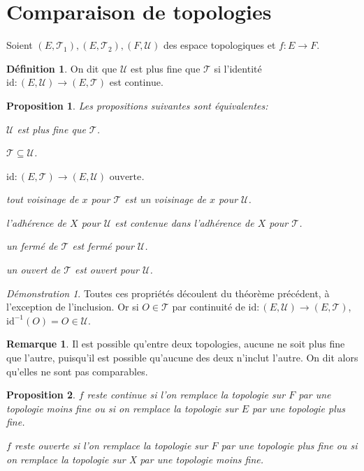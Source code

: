 \documentclass[a4paper, 11pt, french]{book}
\newenvironment{itemise}{\itemize}{\enditemize}
\theoremstyle{plain} %
\newtheorem{proposition}{Proposition}
\theoremstyle{definition} %
\newtheorem{definition}{Définition}
\newtheorem{remarque}{Remarque}
\theoremstyle{remark} %
\newtheorem*{demonstration}{Démonstration}
\newcommand{\1}{\mathds{1}}
\newcommand{\id}{\mathrm{id}}
\newcommand{\inv}[1]{#1^{-1}}
\begin{document}
\section{Comparaison de topologies}

Soient $(E, \mathscr{T}_1), (E, \mathscr{T}_2), (F, \mathscr{U})$ des espace topologiques et $f\colon E\rightarrow F$.

\begin{definition}
	On dit que $\mathscr{U}$ est plus fine que $\mathscr{T}$ si l'identité $\id\colon(E, \mathscr{U})\rightarrow(E, \mathscr{T})$ est continue.
\end{definition}

\begin{proposition}
	Les propositions suivantes sont équivalentes:
	\begin{itemise}
		\item $\mathscr{U}$ est plus fine que $\mathscr{T}$.
		\item $\mathscr{T}\subseteq\mathscr{U}$.
		\item $\id\colon(E, \mathscr{T})\rightarrow(E, \mathscr{U})\text{ ouverte}$.
		\item tout voisinage de $x$ pour $\mathscr{T}$ est un voisinage de $x$ pour $\mathscr{U}$.
		\item l'adhérence de $X$ pour $\mathscr{U}$ est contenue dans l'adhérence de $X$ pour $\mathscr{T}$.
		\item un fermé de $\mathscr{T}$ est fermé pour $\mathscr{U}$.
		\item un ouvert de $\mathscr{T}$ est ouvert pour $\mathscr{U}$.
	\end{itemise}
\end{proposition}

\begin{demonstration}
	Toutes ces propriétés découlent du théorème précédent, à l'exception de l'inclusion.
	Or si $O\in\mathscr{T}$ par continuité de $\id\colon(E, \mathscr{U})\rightarrow(E, \mathscr{T})$, $\inv{\id}(O)=O\in\mathscr{U}$.
\end{demonstration}

\begin{remarque}
	Il est possible qu'entre deux topologies, aucune ne soit plus fine que l'autre, puisqu'il est possible qu'aucune des deux n'inclut l'autre.
	On dit alors qu'elles ne sont pas comparables.
\end{remarque}

\begin{proposition}
	\begin{itemise}
		\item $f$ reste continue si l'on remplace la topologie sur $F$ par une topologie moins fine ou si on remplace la topologie sur $E$ par une topologie plus fine.
		\item $f$ reste ouverte si l'on remplace la topologie sur $F$ par une topologie plus fine ou si on remplace la topologie sur X par une topologie moins fine.
	\end{itemise}
\end{proposition}
\end{document}
